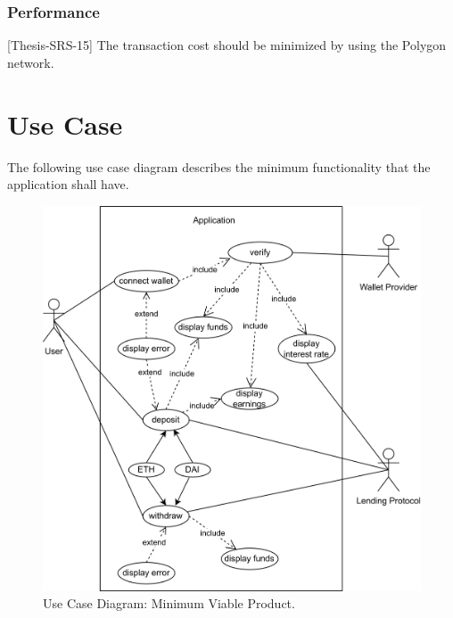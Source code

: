 \documentclass[11pt,a4paper]{report}
\begin{document}
\subsubsection{Performance}
[Thesis-SRS-15] The transaction cost should be minimized by using the Polygon network.

\newpage
\section{Use Case}
The following use case diagram describes the minimum functionality that the application shall have.

\begin{figure}[htp]
	\centering
	\includegraphics[width=1\textwidth]{./images/USECASE-mvp}
	\caption{Use Case Diagram: Minimum Viable Product.}
	\label{fig:usecase-mvp}
\end{figure}
\newpage
\end{document}
